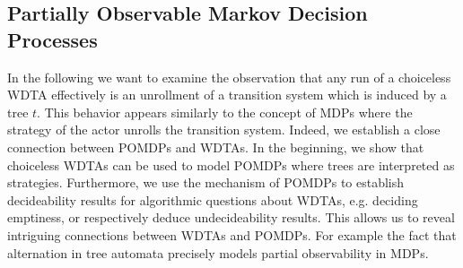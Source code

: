 \subsection{Partially Observable Markov Decision Processes}
In the following we want to examine the observation that any run of a
choiceless \ac{WDTA} effectively is an unrollment of a transition system
which is induced by a tree $t$. This behavior appears similarly to the
concept of \acp{MDP} where the strategy of the actor unrolls the transition
system. Indeed, we establish a close connection between \acp{POMDP} and
\acp{WDTA}. In the beginning, we show that choiceless \acp{WDTA} can be used to
model \acp{POMDP} where trees are interpreted as strategies. Furthermore, we
use the mechanism of \acp{POMDP} to establish decideability results for
algorithmic questions about \acp{WDTA}, e.g. deciding emptiness, or
respectively deduce undecideability results. This allows us to reveal
intriguing connections between \acp{WDTA} and \acp{POMDP}. For example the fact
that alternation in tree automata precisely models partial observability in
\acp{MDP}.


